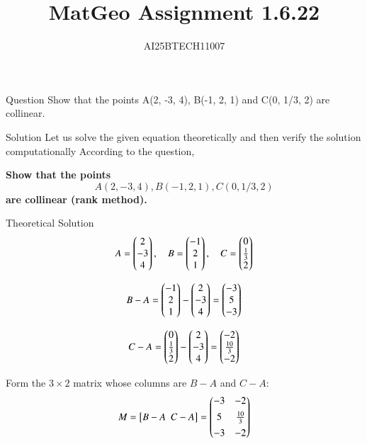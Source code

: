 \documentclass{beamer}
\title 
{MatGeo Assignment 1.6.22}
\author
{AI25BTECH11007}
\begin{document}
\frame{\titlepage}
\begin{frame}{Question}
Show that the points A(2, -3, 4), B(-1, 2, 1) and C(0, 1/3, 2) are collinear.
\end{frame}
\begin{frame}{Solution}
  Let us solve the given equation theoretically and then verify the solution
computationally
According to the question,


\textbf{Show that the points } 
$$A( 2, -3, 4), B( -1, 2, 1), C( 0, 1/3, 2) $$
\textbf{ are collinear (rank method).}
\end{frame}

\begin{frame}{Theoretical Solution}
\begin{equation}
A=\begin{pmatrix}2 \\ -3 \\ 4\end{pmatrix}, \quad 
B=\begin{pmatrix}-1 \\ 2 \\ 1\end{pmatrix}, \quad 
C=\begin{pmatrix}0 \\ \tfrac{1}{3} \\ 2\end{pmatrix}
\end{equation}

\begin{equation}
    B-A=\begin{pmatrix}-1 \\ 2 \\ 1\end{pmatrix}-\begin{pmatrix}2 \\ -3 \\ 4\end{pmatrix}=\begin{pmatrix}-3 \\ 5 \\ -3\end{pmatrix}
\end{equation}

\begin{equation}
   C-A=\begin{pmatrix}0 \\ \tfrac{1}{3} \\ 2\end{pmatrix}-\begin{pmatrix}2 \\ -3 \\ 4\end{pmatrix}
=\begin{pmatrix}-2 \\ \tfrac{10}{3} \\ -2\end{pmatrix}
\end{equation}


Form the $3\times 2$ matrix whose columns are $B-A$ and $C-A$:
\begin{equation}
    M=\big[B-A\ \ C-A\big]
=\begin{pmatrix} -3 & -2 \\[4pt] 5 & \tfrac{10}{3} \\[4pt] -3 & -2 \end{pmatrix}
\end{equation}
\end{frame}
\end{document}

